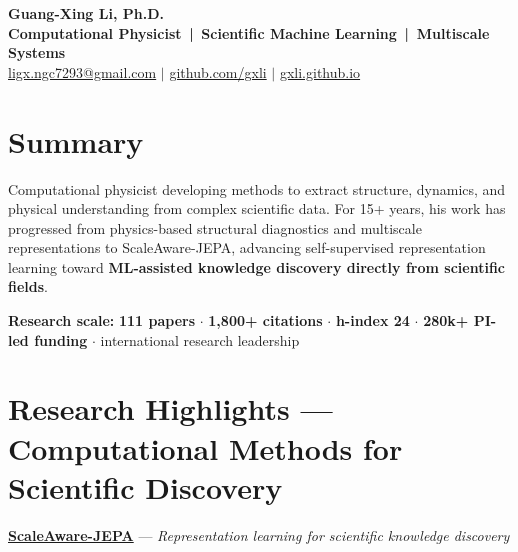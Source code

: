 \documentclass[10pt]{article}
\begin{document}
\begin{center}
  {\Huge\bfseries Guang-Xing Li, Ph.D.}\\[1.5pt]
  {\large\color{accent}\bfseries Computational Physicist \,|\, Scientific Machine Learning \,|\, Multiscale Systems}\\[1.5pt]
  {\small\color{contactgray}
   \href{mailto:ligx.ngc7293@gmail.com}{ligx.ngc7293@gmail.com} \quad$|$\quad
   \href{https://github.com/gxli}{github.com/gxli} \quad$|$\quad
   \href{https://gxli.github.io}{gxli.github.io}}
\end{center}
\vspace{1.5pt}

\section*{Summary}
Computational physicist developing methods to extract structure, dynamics, and physical understanding
from complex scientific data. For 15+ years, his work has progressed from physics-based structural
diagnostics and multiscale representations to ScaleAware-JEPA, advancing self-supervised
representation learning toward \textbf{ML-assisted knowledge discovery directly from scientific
fields}.

{\small\textbf{Research scale:} \textbf{111 papers} $\cdot$ \textbf{1,800+ citations}
$\cdot$ \textbf{h-index 24} $\cdot$ \textbf{\texteuro280k+ PI-led funding} $\cdot$
international research leadership}

\section*{Research Highlights --- Computational Methods for Scientific Discovery}

\href{https://arxiv.org/abs/2606.29723}{\textcolor{accent}{\textbf{ScaleAware-JEPA}}} ---
\textit{Representation learning for scientific knowledge discovery}
\end{document}
